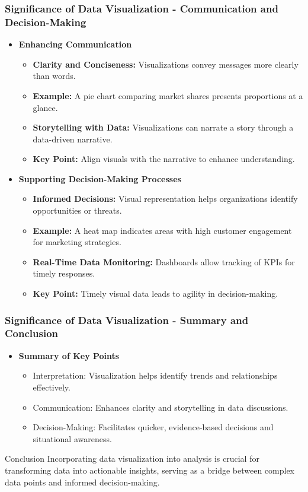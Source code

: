 \documentclass[aspectratio=169]{beamer}
\begin{document}
\begin{frame}[fragile]
    \frametitle{Significance of Data Visualization - Communication and Decision-Making}
    \begin{itemize}
        \item \textbf{Enhancing Communication}
        \begin{itemize}
            \item \textbf{Clarity and Conciseness:} Visualizations convey messages more clearly than words. 
            \item \textbf{Example:} A pie chart comparing market shares presents proportions at a glance.
            \item \textbf{Storytelling with Data:} Visualizations can narrate a story through a data-driven narrative.
            \item \textbf{Key Point:} Align visuals with the narrative to enhance understanding.
        \end{itemize}
        
        \item \textbf{Supporting Decision-Making Processes}
        \begin{itemize}
            \item \textbf{Informed Decisions:} Visual representation helps organizations identify opportunities or threats.
            \item \textbf{Example:} A heat map indicates areas with high customer engagement for marketing strategies.
            \item \textbf{Real-Time Data Monitoring:} Dashboards allow tracking of KPIs for timely responses.
            \item \textbf{Key Point:} Timely visual data leads to agility in decision-making.
        \end{itemize}
    \end{itemize}
\end{frame}

\begin{frame}[fragile]
    \frametitle{Significance of Data Visualization - Summary and Conclusion}
    \begin{itemize}
        \item \textbf{Summary of Key Points}
        \begin{itemize}
            \item Interpretation: Visualization helps identify trends and relationships effectively.
            \item Communication: Enhances clarity and storytelling in data discussions.
            \item Decision-Making: Facilitates quicker, evidence-based decisions and situational awareness.
        \end{itemize}
    \end{itemize}
    \begin{block}{Conclusion}
        Incorporating data visualization into analysis is crucial for transforming data into actionable insights, serving as a bridge between complex data points and informed decision-making.
    \end{block}
\end{frame}
\end{document}
